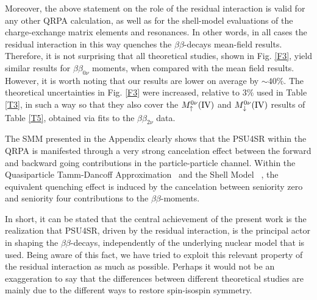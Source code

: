 \documentclass[nofootinbib,twocolumn,eqsecnum,floats,aps]{revtex4}
\def\b {{\beta}}
\begin{document}
{Moreover, the above  statement on the role of the residual interaction  is valid for any other QRPA calculation, as
well as for the shell-model evaluations of the charge-exchange
matrix elements and resonances. In other words,   in all cases
the residual interaction
in this way
quenches the $\b\b$-decays mean-field results.
Therefore, it is not surprising that all theoretical studies, shown in Fig. \ref{F3},
yield similar results for $\b\b_{0\nu}$ moments, when compared with
the mean field results.  However,
it is worth noting that our results are lower on average  
by $\sim 40\%$. 
The theoretical uncertainties  in Fig. \ref{F3} were increased,  relative to $3\%$ used in Table \ref{T3}, in such a way so that they also cover  the $M^{0\nu}_{\uparrow}(\rm{IV})$ and $M^{0\nu}_{\downarrow}(\rm{IV})$ results of Table \ref{T5}, obtained via fits to the  $\b\b_{2\nu}$ data.


 The SMM presented in the Appendix
clearly shows that the PSU4SR %
within the QRPA is manifested through
a very strong cancelation effect between the forward and backward going
contributions in the particle-particle channel. Within the
Quasiparticle Tamm-Dancoff Approximation~\cite{Kr05} and
the Shell Model ~\cite{Iwa16},  the equivalent quenching effect is
induced by the cancelation between seniority zero and
seniority four contributions to the $\b\b$-moments.


In short, it can be stated that the central achievement of the present
work is the realization that PSU4SR, %
driven by the residual interaction,
is the principal actor in shaping the $\b\b$-decays, independently of
the underlying nuclear model that is used.
Being aware of this fact, we have tried to exploit  this relevant property of
the residual interaction as much as possible.
Perhaps it would not be an exaggeration to say that the differences
between different theoretical studies are mainly due to the different
ways to restore spin-isospin symmetry.

}
\end{document}
